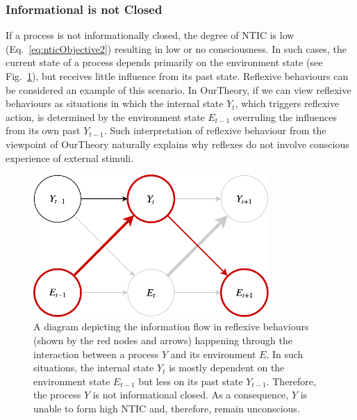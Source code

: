 \documentclass[utf8]{article}
\begin{document}
            \subsubsection*{Informational is not Closed}\label{sec:reflexive}
                If a process is not informationally closed, the degree of NTIC is low (Eq.~\ref{eq:nticObjective2}) resulting in low or no consciousness. In such cases, the current state of a process depends primarily on the environment state (see Fig.~\ref{fig:reflexive}), but receives little influence from its past state. Reflexive behaviours \citep{casali2013theoretically} can be considered an example of this scenario. In \ac{OurTheory}, if we can view reflexive behaviours as situations in which the internal state $Y_t$, which triggers reflexive action, is determined by the environment state $E_{t-1}$ overruling the influences from its own past $Y_{t-1}$.  Such interpretation of reflexive behaviour from the viewpoint of \ac{OurTheory} naturally explains why reflexes do not involve conscious experience of external stimuli. 

        		\begin{figure}[H]
        			\includegraphics[width=0.8\textwidth]{WritingMaterials/Fig_Reflexive/Reflexive.pdf}
        			\caption{
        			    A diagram depicting the information flow in reflexive behaviours (shown by the red nodes and arrows) happening through the interaction between a process $Y$ and its environment $E$. In such situations, the internal state $Y_t$ is mostly dependent on the environment state $E_{t-1}$ but less on its past state $Y_{t-1}$. Therefore, the process $Y$ is not informational closed. As a  consequence, $Y$ is unable to form high NTIC and, therefore, remain unconscious. 
        			    }
        			\label{fig:reflexive}
        		\end{figure}  
        		
\end{document}
